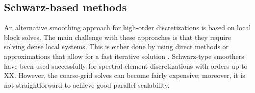 \documentclass[smallcondensed,final]{svjour3}     %
\begin{document}
% 		
% 		
% 		
% 		
% 		
% 		
% 		
% 		



\subsection{Schwarz-based methods}\label{subsec:schwarz}
An alternative smoothing approach for high-order discretizations is
based on local block solves.  The main challenge with these approaches
is that they require solving dense local systems.  This is either done
by using direct methods or approximations that allow for a fast
iterative solution
\cite{LottesFischer05,FischerLottes05}. Schwarz-type smoothers have
been used successfully for spectral element discretizations with
orders up to XX. However, the coarse-grid solves can become fairly
expensive; moreover, it is not straightforward to achieve good
parallel scalability.
\end{document}
